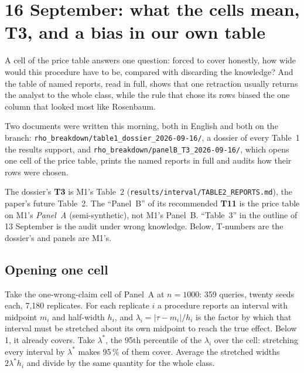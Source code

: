 \chapter{16 September: what the cells mean, T3, and a bias in our own table}\label{ch:tables}

\begin{ideia}
A cell of the price table answers one question: forced to cover honestly, how wide would this
procedure have to be, compared with discarding the knowledge? And the table of named reports, read
in full, shows that one retraction usually returns the analyst to the whole class, while the rule
that chose its rows biased the one column that looked most like Rosenbaum.
\end{ideia}

Two documents were written this morning, both in English and both on the branch:
\nolinkurl{rho_breakdown/table1_dossier_2026-09-16/}, a dossier of every Table~1 the results support,
and \nolinkurl{rho_breakdown/panelB_T3_2026-09-16/}, which opens one cell of the price table, prints the
named reports in full and audits how their rows were chosen.

\begin{armadilha}
The dossier's \textbf{T3} is M1's Table~2 (\texttt{results/interval/TABLE2\_REPORTS.md}), the paper's
future Table~2. The ``Panel~B'' of its recommended \textbf{T11} is the price table on M1's
\emph{Panel~A} (semi-synthetic), not M1's Panel~B. ``Table~3'' in the outline of 13 September is the
audit under wrong knowledge. Below, T-numbers are the dossier's and panels are M1's.
\end{armadilha}

\begin{antes}
\end{antes}

\section{Opening one cell}

Take the one-wrong-claim cell of Panel~A at $n = 1000$: 359 queries, twenty seeds each, 7,180
replicates. For each replicate $i$ a procedure reports an interval with midpoint $m_i$ and half-width
$h_i$, and $\lambda_i = |\tau - m_i| / h_i$ is the factor by which that interval must be stretched about
its own midpoint to reach the true effect. Below 1, it already covers. Take $\lambda^{*}$, the 95th
percentile of the $\lambda_i$ over the cell: stretching every interval by $\lambda^{*}$ makes 95\,\% of
them cover. Average the stretched widths $2\lambda^{*}h_i$ and divide by the same quantity for the
whole class.

